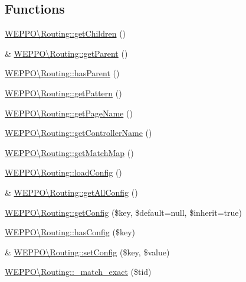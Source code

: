 \subsection*{Functions}
\begin{DoxyCompactItemize}
\item 
\hyperlink{namespaceWEPPO_1_1Routing_a1d53296d0e2c843dde991a73ed41711d}{W\+E\+P\+P\+O\textbackslash{}\+Routing\+::get\+Children} ()
\item 
\& \hyperlink{namespaceWEPPO_1_1Routing_ac2da3532fbf1139b4450e829d51267dc}{W\+E\+P\+P\+O\textbackslash{}\+Routing\+::get\+Parent} ()
\item 
\hyperlink{namespaceWEPPO_1_1Routing_aa7b2f9fd1cde80e31d0c05b7cb120036}{W\+E\+P\+P\+O\textbackslash{}\+Routing\+::has\+Parent} ()
\item 
\hyperlink{namespaceWEPPO_1_1Routing_aca97d433a3fbefc33376a9e1518ad828}{W\+E\+P\+P\+O\textbackslash{}\+Routing\+::get\+Pattern} ()
\item 
\hyperlink{namespaceWEPPO_1_1Routing_aa5f3adb2a95328e74c47f5d3727cbf01}{W\+E\+P\+P\+O\textbackslash{}\+Routing\+::get\+Page\+Name} ()
\item 
\hyperlink{namespaceWEPPO_1_1Routing_a9be5aa06acfa27abba6249ac9df81eee}{W\+E\+P\+P\+O\textbackslash{}\+Routing\+::get\+Controller\+Name} ()
\item 
\hyperlink{namespaceWEPPO_1_1Routing_a34ff57f89f3c46907a35341eeac2833d}{W\+E\+P\+P\+O\textbackslash{}\+Routing\+::get\+Match\+Map} ()
\item 
\hyperlink{namespaceWEPPO_1_1Routing_a873a0da3c9f234cad91c1f99015ff0d0}{W\+E\+P\+P\+O\textbackslash{}\+Routing\+::load\+Config} ()
\item 
\& \hyperlink{namespaceWEPPO_1_1Routing_a51c1dccb266d89994bfe234040ae7a86}{W\+E\+P\+P\+O\textbackslash{}\+Routing\+::get\+All\+Config} ()
\item 
\hyperlink{namespaceWEPPO_1_1Routing_a8b3515ee64b7cb3fd4c52a1720dd1587}{W\+E\+P\+P\+O\textbackslash{}\+Routing\+::get\+Config} (\$key, \$default=null, \$inherit=true)
\item 
\hyperlink{namespaceWEPPO_1_1Routing_a87af3e5ddeccb4a92e80faab4d7c4397}{W\+E\+P\+P\+O\textbackslash{}\+Routing\+::has\+Config} (\$key)
\item 
\& \hyperlink{namespaceWEPPO_1_1Routing_a8cfa1bbccd30c7902723a5991d82b82c}{W\+E\+P\+P\+O\textbackslash{}\+Routing\+::set\+Config} (\$key, \$value)
\item 
\hyperlink{namespaceWEPPO_1_1Routing_a98cfbc2c13f28e74275ed055a1b9499a}{W\+E\+P\+P\+O\textbackslash{}\+Routing\+::\+\_\+match\+\_\+exact} (\$tid)

\end{DoxyCompactItemize}
